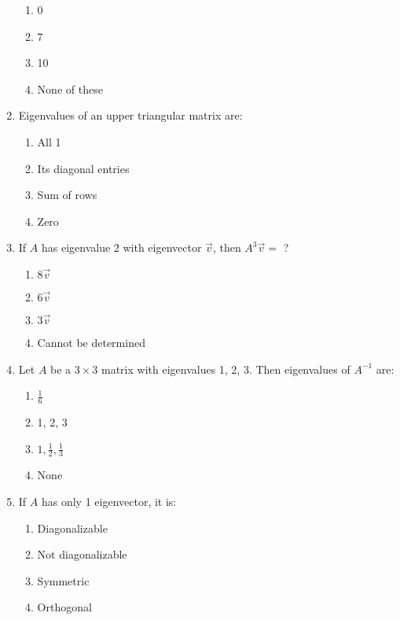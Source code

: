 \begin{enumerate}
\begin{enumerate}[label=(\alph*)]
\item 0 \quad \item 7 \quad \item 10 \quad \item None of these
\end{enumerate}

\item Eigenvalues of an upper triangular matrix are:

\begin{enumerate}[label=(\alph*)]
\item All 1 \quad \item Its diagonal entries \quad \item Sum of rows \quad \item Zero
\end{enumerate}

\item If \( A \) has eigenvalue 2 with eigenvector \( \vec{v} \), then \( A^3 \vec{v} = \) ?

\begin{enumerate}[label=(\alph*)]
\item \( 8 \vec{v} \) \quad \item \( 6 \vec{v} \) \quad \item \( 3 \vec{v} \) \quad \item Cannot be determined
\end{enumerate}

\item Let \( A \) be a \( 3 \times 3 \) matrix with eigenvalues 1, 2, 3. Then eigenvalues of \( A^{-1} \) are:

\begin{enumerate}[label=(\alph*)]
\item \( \frac{1}{6} \) \quad \item 1, 2, 3 \quad \item \( 1, \frac{1}{2}, \frac{1}{3} \) \quad \item None
\end{enumerate}

\item If \( A \) has only 1 eigenvector, it is:

\begin{enumerate}[label=(\alph*)]
\item Diagonalizable 
\item Not diagonalizable 
\item Symmetric 
\item Orthogonal
\end{enumerate}


\end{enumerate}
